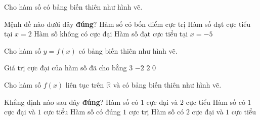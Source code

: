 \begin{ex}%
    Cho hàm số có bảng biến thiên như hình vẽ.
    \begin{center}
    \end{center}
    Mệnh đề nào dưới đây \textbf{đúng}?
    \choice
    {Hàm số có bốn điểm cực trị}
    {\True Hàm số đạt cực tiểu tại $x=2$}
    {Hàm số không có cực đại}
    {Hàm số đạt cực tiểu tại $x=-5$}
\end{ex}
\begin{ex}%
    Cho hàm số $y=f(x)$ có bảng biến thiên như hình vẽ.
    \begin{center}
    \end{center}
    Giá trị cực đại của hàm số đã cho bằng
    \choice
    {\True $ 3 $}
    {$ -2 $ }
    {$ 2 $ }
    {$ 0 $ }
\end{ex}
\begin{ex}%
    Cho hàm số $f(x)$ liên tục trên $\mathbb{R}$ và có bảng biến thiên như hình vẽ.
    \begin{center}

    \end{center}
    Khẳng định nào sau đây \textbf{đúng}?
    \choice
    {Hàm số có $ 1 $ cực đại và $ 2 $ cực tiểu}
    {\True Hàm số có $ 1 $ cực đại và $ 1 $ cực tiểu}
    {Hàm số có đúng $ 1 $ cực trị}
    {Hàm số có $ 2 $ cực đại và $ 1 $ cực tiểu}
\end{ex}

